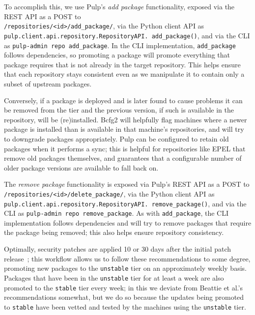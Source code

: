 To accomplish this, we use Pulp's \emph{add package} functionality,
exposed via the REST API as a POST
to\\ \texttt{/repositories/<id>/add\_package/}, via the Python client
API as\\ \texttt{pulp.client.api.repository.RepositoryAPI.
  add\_package()}, and via the CLI as \texttt{pulp-admin repo
  add\_package}.  In the CLI implementation, \texttt{add\_package}
follows dependencies, so promoting a package will promote everything
that package requires that is not already in the target repository.
This helps ensure that each repository stays consistent even as we
manipulate it to contain only a subset of upstream packages.

Conversely, if a package is deployed and is later found to cause
problems it can be removed from the tier and the previous version, if
such is available in the repository, will be (re)installed.  Bcfg2
will helpfully flag machines where a newer package is installed than
is available in that machine's repositories, and will try to downgrade
packages appropriately.  Pulp can be configured to retain old packages
when it performs a sync; this is helpful for repositories like EPEL
that remove old packages themselves, and guarantees that a
configurable number of older package versions are available to fall
back on.

The \emph{remove package} functionality is exposed via Pulp's REST API
as a POST to\\ \texttt{/repositories/<id>/delete\_package/}, via the
Python client API
as\\ \texttt{pulp.client.api.repository.RepositoryAPI.
  remove\_package()}, and via the CLI as \texttt{pulp-admin repo
  remove\_package}.  As with \texttt{add\_package}, the CLI
implementation follows dependencies and will try to remove packages
that require the package being removed; this also helps ensure
repository consistency.

Optimally, security patches are applied 10 or 30 days after the
initial patch release~\cite{BACWWS02}; this workflow allows us to
follow these recommendations to some degree, promoting new packages to
the \texttt{unstable} tier on an approximately weekly basis.  Packages
that have been in the \texttt{unstable} tier for at least a week are
also promoted to the \texttt{stable} tier every week; in this we
deviate from Beattie et al.'s recommendations somewhat, but we do so
because the updates being promoted to \texttt{stable} have been vetted
and tested by the machines using the \texttt{unstable} tier.


